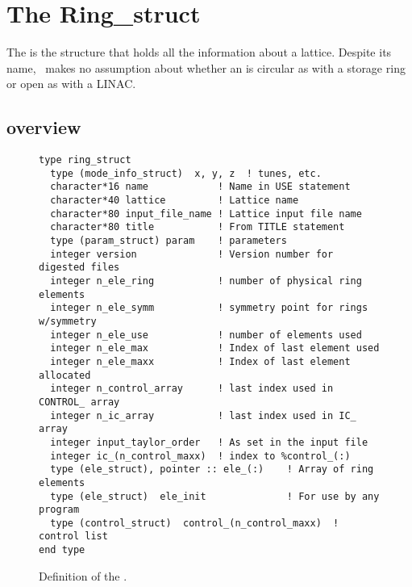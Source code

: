 \chapter{The Ring\_struct}


The  is the structure that holds all the information 
about a lattice.   Despite its name, \bmad\
makes no assumption about whether an  is circular as
with a storage ring or open as with a LINAC.

\section{overview}

\begin{figure}[tb]
\centering
\begin{verbatim}
type ring_struct
  type (mode_info_struct)  x, y, z  ! tunes, etc.
  character*16 name            ! Name in USE statement
  character*40 lattice         ! Lattice name
  character*80 input_file_name ! Lattice input file name
  character*80 title           ! From TITLE statement
  type (param_struct) param    ! parameters
  integer version              ! Version number for digested files
  integer n_ele_ring           ! number of physical ring elements
  integer n_ele_symm           ! symmetry point for rings w/symmetry
  integer n_ele_use            ! number of elements used
  integer n_ele_max            ! Index of last element used
  integer n_ele_maxx           ! Index of last element allocated
  integer n_control_array      ! last index used in CONTROL_ array
  integer n_ic_array           ! last index used in IC_ array
  integer input_taylor_order   ! As set in the input file
  integer ic_(n_control_maxx)  ! index to %control_(:)
  type (ele_struct), pointer :: ele_(:)    ! Array of ring elements
  type (ele_struct)  ele_init              ! For use by any program
  type (control_struct)  control_(n_control_maxx)  ! control list
end type
\end{verbatim}
\caption{Definition of the .}
\label{f:ring_struct}
\end{figure}


